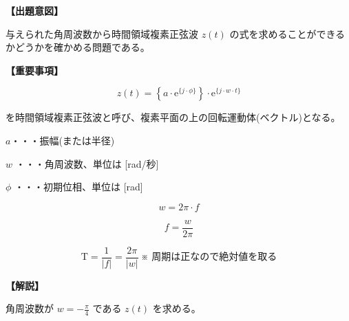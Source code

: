 \noindent \textbf{【出題意図】}

\bigskip
\noindent 与えられた角周波数から時間領域複素正弦波 $z(t)$ の式を求めることができるかどうかを確かめる問題である。

\vspace{1em}
\noindent \textbf{【重要事項】}

\[
z(t) =  \left \{ a \cdot \textrm{e}^{\{j \cdot \phi\}} \right \} 
\cdot \textrm{e}^{\{j \cdot w \cdot t \}}
\]

\bigskip
\noindent を時間領域複素正弦波と呼び、複素平面の上の回転運動体(ベクトル)となる。

\bigskip
\noindent\quad  $a$・・・振幅(または半径)

\bigskip
\noindent\quad $w$ ・・・角周波数、単位は [rad/秒]

\bigskip
\noindent\quad $\phi$ ・・・初期位相、単位は [rad]

\[
w = 2\pi \cdot f
\]

\[
f = \frac{w}{2\pi} 
\]

\[
\textrm{T} = \frac{1}{|f|} = \frac{2\pi}{|w|}   \ \mbox{※ 周期は正なので絶対値を取る}
\]

\bigskip

\vspace{1em}
\noindent \textbf{【解説】}

\bigskip
\noindent 角周波数が $w = -\frac{\pi}{4}$ である $z(t)$ を求める。
